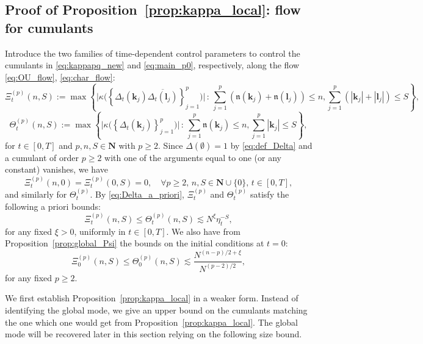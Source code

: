 \documentclass[10pt]{amsart}
\numberwithin{equation}{section}
\newcommand{\nc}{\normalcolor}
\newcommand{\N}{\mathbf{N}}
\begin{document}
\subsection{Proof of Proposition~\ref{prop:kappa_local}: flow for cumulants}\label{sec:p0}

Introduce the two families of time-dependent control parameters to control the cumulants in \eqref{eq:kappapq_new} and \eqref{eq:main_p0}, respectively, along the flow \eqref{eq:OU_flow}, \eqref{eq:char_flow}:
\begin{equation}
\Xi_t^{(p)}(n,S):=\max\left\lbrace \Big|\kappa\Big(\left\lbrace \Delta_t(\bm{k}_j)\overline{\Delta_t(\bm{l}_j)}\right\rbrace_{j=1}^p\Big)\Big|\,:\, \sum_{j=1}^p (\mathfrak{n}(\bm{k}_j)+\mathfrak{n}(\bm{l}_j))\le n,\sum_{j=1}^p (|\bm{k}_j|+|\bm{l}_j|)\le S\right\rbrace,\label{eq:def_Xi}
\end{equation}
\begin{equation}
\Theta_t^{(p)}(n,S):=\max\left\lbrace \Big|\kappa\Big(\left\lbrace \Delta_t(\bm{k}_j)\right\rbrace_{j=1}^p\Big)\Big|\,:\, \sum_{j=1}^p \mathfrak{n}(\bm{k}_j)\le n,\sum_{j=1}^p |\bm{k}_j|\le S\right\rbrace,\label{eq:def_Theta}
\end{equation}
for $t\in [0,T]$ and $p,n,S\in\N$ with $p\ge 2$.  Since $\Delta(\emptyset)=1$ by \eqref{eq:def_Delta} and a cumulant of order $p\ge 2$ with one of the arguments equal to one (or any constant) vanishes, we have
\begin{equation}
\Xi_t^{(p)}(n,0)=\Xi_t^{(p)}(0,S)=0,\quad \forall p\ge 2, \, n,S\in\N\cup\{0\},\, t\in [0,T],
\end{equation}
and similarly for $\Theta_t^{(p)}$. \nc By \eqref{eq:Delta_a_priori}, $\Xi_t^{(p)}$ and $\Theta_t^{(p)}$ satisfy the following a priori bounds:
\begin{equation}
\Xi_t^{(p)}(n,S)\le \Theta_t^{(p)}(n,S)\lesssim N^\xi\eta_t^{-S},
\label{eq:Theta_a_priori}
\end{equation}
for any fixed $\xi>0$, uniformly in $t\in [0,T]$. We also have from Proposition~\ref{prop:global_Psi} the bounds on the initial conditions at $t=0$:
\begin{equation}
\Xi_0^{(p)}(n,S)\le \Theta_0^{(p)}(n,S) \lesssim \frac{N^{(n-p)/2+\xi}}{N^{(p-2)/2}},
\end{equation}
for any fixed $p\ge 2$. 


We first establish Proposition~\ref{prop:kappa_local} in a weaker form. Instead of identifying the global mode, we give an upper bound on the cumulants matching the one which one would get from Proposition~\ref{prop:kappa_local}. The global mode will be recovered later in this section relying on the following size bound.
\end{document}
